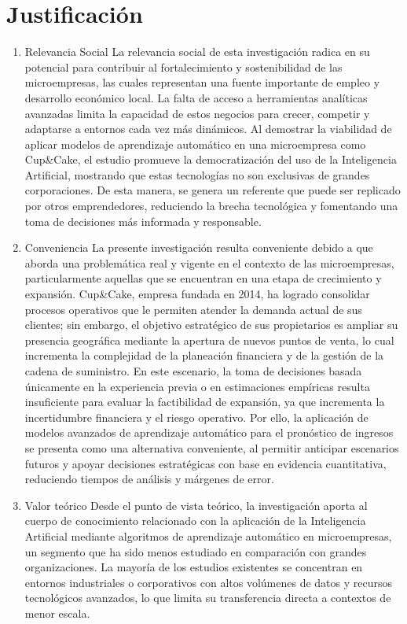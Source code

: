 \documentclass[12pt]{book}
\begin{document}
\section*{Justificación}
\begin{enumerate}
\item Relevancia Social
La relevancia social de esta investigación radica en su potencial para contribuir al fortalecimiento y sostenibilidad de las microempresas, las cuales representan una fuente importante de empleo y desarrollo económico local. La falta de acceso a herramientas analíticas avanzadas limita la capacidad de estos negocios para crecer, competir y adaptarse a entornos cada vez más dinámicos.
Al demostrar la viabilidad de aplicar modelos de aprendizaje automático en una microempresa como Cup&Cake, el estudio promueve la democratización del uso de la Inteligencia Artificial, mostrando que estas tecnologías no son exclusivas de grandes corporaciones. De esta manera, se genera un referente que puede ser replicado por otros emprendedores, reduciendo la brecha tecnológica y fomentando una toma de decisiones más informada y responsable.
\item Conveniencia
La presente investigación resulta conveniente debido a que aborda una problemática real y vigente en el contexto de las microempresas, particularmente aquellas que se encuentran en una etapa de crecimiento y expansión. Cup&Cake, empresa fundada en 2014, ha logrado consolidar procesos operativos que le permiten atender la demanda actual de sus clientes; sin embargo, el objetivo estratégico de sus propietarios es ampliar su presencia geográfica mediante la apertura de nuevos puntos de venta, lo cual incrementa la complejidad de la planeación financiera y de la gestión de la cadena de suministro.
En este escenario, la toma de decisiones basada únicamente en la experiencia previa o en estimaciones empíricas resulta insuficiente para evaluar la factibilidad de expansión, ya que incrementa la incertidumbre financiera y el riesgo operativo. Por ello, la aplicación de modelos avanzados de aprendizaje automático para el pronóstico de ingresos se presenta como una alternativa conveniente, al permitir anticipar escenarios futuros y apoyar decisiones estratégicas con base en evidencia cuantitativa, reduciendo tiempos de análisis y márgenes de error.
\item Valor teórico
Desde el punto de vista teórico, la investigación aporta al cuerpo de conocimiento relacionado con la aplicación de la Inteligencia Artificial mediante algoritmos de aprendizaje automático en microempresas, un segmento que ha sido menos estudiado en comparación con grandes organizaciones. La mayoría de los estudios existentes se concentran en entornos industriales o corporativos con altos volúmenes de datos y recursos tecnológicos avanzados, lo que limita su transferencia directa a contextos de menor escala.

\end{enumerate}
\end{document}

